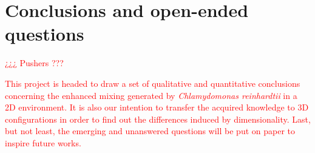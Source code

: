 \section{Conclusions and open-ended questions}

\textcolor{red}{¿¿¿ Pushers ???}

\textcolor{red}{This project is headed to draw a set of qualitative and quantitative conclusions concerning the enhanced mixing generated by \textit{Chlamydomonas reinhardtii} in a 2D environment. It is also our intention to transfer the acquired knowledge to 3D configurations in order to find out the differences induced by dimensionality. Last, but not least, the emerging and unanswered questions will be put on paper to inspire future works.}